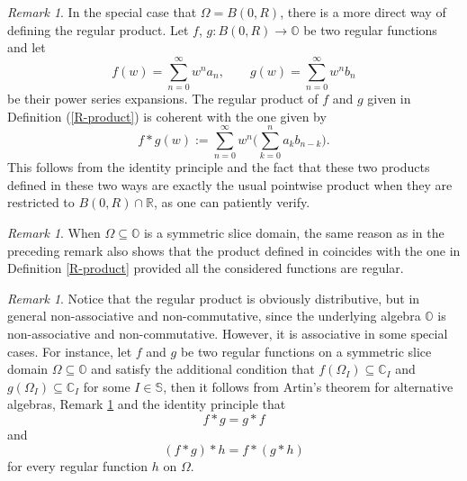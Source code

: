 \documentclass{amsart}
\theoremstyle{definition}
\theoremstyle{remark}
\newtheorem{remark}[theorem]{Remark}
\numberwithin{equation}{section}
\begin{document}
\begin{remark}\label{remark on R-product01}
In the special case that $\Omega=B(0,R)$, there is a more direct way of defining the regular product.
Let $f$, $g:B(0,R)\rightarrow \mathbb O$ be two regular functions and let
\begin{equation*}\label{def of regular product}
f(w)=\sum\limits_{n=0}^{\infty}w^na_n,\qquad g(w)=\sum\limits_{n=0}^{\infty}w^nb_n
\end{equation*}
be their power series expansions. The regular product  of $f$ and $g$ given in Definition (\ref{R-product}) is coherent with  the one given by
$$f\ast g(w):=\sum\limits_{n=0}^{\infty}w^n\bigg(\sum\limits_{k=0}^n a_kb_{n-k}\bigg).$$
This follows from the identity principle and the fact that these two products defined in  these two ways are exactly the usual pointwise product  when they are restricted to $B(0,R)\cap\mathbb R$, as one can patiently verify.
\end{remark}

\begin{remark}\label{remark on R-product02}
When $\Omega\subseteq \mathbb O$ is a symmetric slice domain, the same reason as in the preceding remark also shows that the product defined in \cite[Definition 9]{Ghiloni1} coincides with the one in Definition \ref{R-product} provided all the considered functions are  regular.
\end{remark}

\begin{remark}\label{remark on R-product03}
Notice that the regular product is obviously distributive, but in general non-associative and non-commutative, since the underlying algebra $\mathbb O$ is non-associative and non-commutative. However, it is associative in some special cases. For instance, let $f$ and $g$ be two regular functions on  a symmetric slice domain $\Omega\subseteq \mathbb O$ and satisfy the additional condition that $f(\Omega_I)\subseteq\mathbb C_I$ and $g(\Omega_I)\subseteq\mathbb C_I$ for some $I\in\mathbb S$, then it follows from Artin's theorem for alternative algebras, Remark \ref{remark on R-product01} and the identity principle that
$$f\ast g=g\ast f$$
and
$$(f\ast g)\ast h=f\ast(g\ast h)$$
for every regular function $h$ on $\Omega$.
\end{remark}
\end{document}

